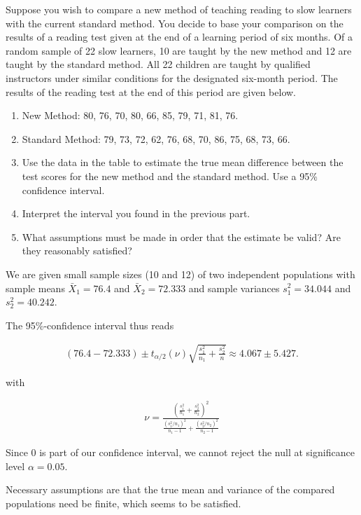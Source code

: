 
\begin{exercise}

Suppose you wish to compare a new method of teaching reading to slow
learners with the current standard method. You decide to base your
comparison on the results of a reading test given at the end of a learning
period of six months. Of a random sample of 22 slow learners, 10 are taught
by the new method and 12 are taught by the standard method.
All 22 children are taught by qualified instructors under similar
conditions for the designated six-month period. The results of the reading
test at the end of this period are given below.

\begin{enumerate}[label = (\alph*)]
    \item[] New Method: 80, 76, 70, 80, 66, 85, 79, 71, 81, 76.
    \item[] Standard Method: 79, 73, 72, 62, 76, 68, 70, 86, 75, 68, 73, 66.
    \item Use the data in the table to estimate the true mean difference
    between the test scores for the new method and the standard method.
    Use a 95\% confidence interval.
    \item Interpret the interval you found in the previous part.
    \item What assumptions must be made in order that the estimate be valid?
    Are they reasonably satisfied?
\end{enumerate}

\end{exercise}


\begin{solution}

We are given small sample sizes (10 and 12) of two independent populations
with sample means $\bar{X}_1 = 76.4$ and $\bar{X}_2 = 72.333$ and sample
variances $s_1^2 = 34.044$ and $s_2^2 = 40.242$.

The 95\%-confidence interval thus reads

\begin{align*}
    (76.4 - 72.333) \pm t_{\alpha/2}(\nu)\sqrt{\frac{s_1^2}{n_1} + \frac{s_2^2}{n}}
    \approx 4.067 \pm 5.427.
\end{align*}

with 

\begin{align*}
    \nu = \frac{\left(\frac{s_1^2}{n_1} +  \frac{s_2^2}{n_2}\right)^2}
            {\frac{(s_1^2/n_1)^2}{n_1 - 1} + \frac{(s_2^2/n_2)^2}{n_2 - 1}}
\end{align*}

Since $0$ is part of our confidence interval, we cannot reject the null
at significance level $\alpha = 0.05$.

Necessary assumptions are that the true mean and variance of the compared
populations need be finite, which seems to be satisfied.
\end{solution}

